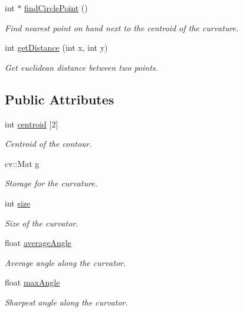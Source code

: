 \begin{DoxyCompactItemize}
int $\ast$ \hyperlink{structcurve_a9c28c74ac0f9ce59290079125ff65a5d}{find\+Circle\+Point} ()
\begin{DoxyCompactList}\small\item\em Find nearest point on hand next to the centroid of the curvature. \end{DoxyCompactList}\item 
int \hyperlink{structcurve_af270a465ea41efcb89b930490aaf8d20}{get\+Distance} (int x, int y)
\begin{DoxyCompactList}\small\item\em Get euclidean distance between two points. \end{DoxyCompactList}\end{DoxyCompactItemize}
\subsection*{Public Attributes}
\begin{DoxyCompactItemize}
\item 
int \hyperlink{structcurve_a434421bfdc9c8961a28590ef99f83e00}{centroid} \mbox{[}2\mbox{]}
\begin{DoxyCompactList}\small\item\em Centroid of the contour. \end{DoxyCompactList}\item 
cv\+::\+Mat \hyperlink{structcurve_afb7fe75fc30f7a832dbb845db62a5244}{g}
\begin{DoxyCompactList}\small\item\em Storage for the curvature. \end{DoxyCompactList}\item 
int \hyperlink{structcurve_a6a90092a2b62540ae3993cdb469f8451}{size}
\begin{DoxyCompactList}\small\item\em Size of the curvator. \end{DoxyCompactList}\item 
float \hyperlink{structcurve_a67806447783717dcb334f0e6c8dd0093}{average\+Angle}
\begin{DoxyCompactList}\small\item\em Average angle along the curvator. \end{DoxyCompactList}\item 
float \hyperlink{structcurve_ae5ccde75e194081b8c4b0c00f7af4879}{max\+Angle}
\begin{DoxyCompactList}\small\item\em Sharpest angle along the curvator. \end{DoxyCompactList}\end{DoxyCompactItemize}


